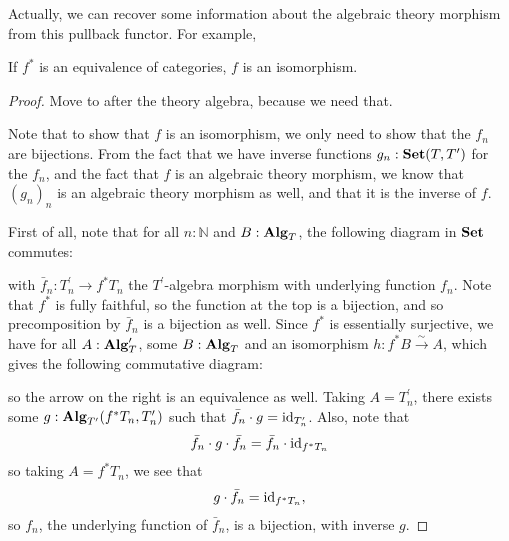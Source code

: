 Actually, we can recover some information about the algebraic theory morphism from this pullback functor. For example,
\begin{lemma}\label{lem:algebra-pullback-equivalence}
  If $ f^* $ is an equivalence of categories, $ f $ is an isomorphism.
\end{lemma}
\begin{proof}
  \TODO Move to after the theory algebra, because we need that.

  Note that to show that $ f $ is an isomorphism, we only need to show that the $ f_n $ are bijections. From the fact that we have inverse functions $ g_n : \mathbf{Set}(T, T^\prime) $ for the $ f_n $, and the fact that $ f $ is an algebraic theory morphism, we know that $ (g_n)_n $ is an algebraic theory morphism as well, and that it is the inverse of $ f $.

  First of all, note that for all $ n : \mathbb N $ and $ B : \mathbf{Alg}_{T} $, the following diagram in $ \mathbf{Set} $ commutes:
  \begin{center}
  \end{center}
  with $ \bar f_n: T^\prime_n \to f^* T_n $ the $ T^\prime $-algebra morphism with underlying function $ f_n $. Note that $ f^* $ is fully faithful, so the function at the top is a bijection, and so precomposition by $ \bar f_n $ is a bijection as well. Since $ f^* $ is essentially surjective, we have for all $ A : \mathbf{Alg}_{T}^\prime $, some $ B : \mathbf{Alg}_{T} $ and an isomorphism $ h: f^* B \xrightarrow \sim A $, which gives the following commutative diagram:
  \begin{center}
  \end{center}
  so the arrow on the right is an equivalence as well. Taking $ A = T^\prime_n $, there exists some $ g: \mathbf{Alg}_{T^\prime}(f^* T_n, T^\prime_n) $ such that $ \bar f_n \cdot g = \text{id}_{T^\prime_n} $. Also, note that
  \[ \bar f_n \cdot g \cdot \bar f_n = \bar f_n \cdot \text{id}_{f^* T_n} \]
  so taking $ A = f^* T_n $, we see that
  \[ g \cdot \bar f_n = \text{id}_{f^* T_n}, \]
  so $ f_n $, the underlying function of $ \bar f_n $, is a bijection, with inverse $ g $.
\end{proof}

